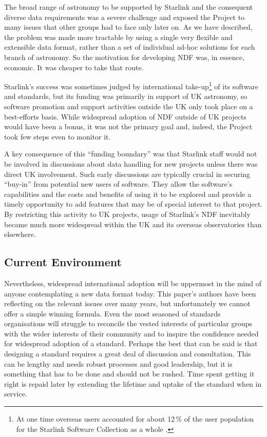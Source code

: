 \documentclass[final,authoryear,5p,times,twocolumn]{elsarticle}
\begin{document}
The broad range of astronomy to be supported by Starlink and the
consequent diverse data requirements was a severe challenge and
exposed the Project to many issues that other groups had to face only
later on. As we have described, the problem was made more tractable by
using a single very flexible and extensible data format, rather than a
set of individual ad-hoc solutions for each branch of astronomy. So
the motivation for developing NDF was, in essence,
economic. It was cheaper to take that route.

Starlink's success was sometimes judged by international
take-up\footnote{At one time overseas users accounted for about
 12\,\% of the user population for the Starlink Software Collection
 as a whole \citep{1992STARB..10...30L}.} of its
software and standards, but its funding was primarily in support of UK
astronomy, so software promotion and support activities outside the UK
only took place on a best-efforts basis. While widespread adoption of
NDF outside of UK projects would have been a bonus, it was
not the primary goal and, indeed, the Project took few steps even to
monitor it.

A key consequence of this ``funding boundary'' was that Starlink staff
would not be involved in discussions about data handling for new
projects unless there was direct UK involvement. Such early
discussions are typically crucial in securing ``buy-in'' from potential
new users of software. They allow the software's capabilities and the
costs and benefits of using it to be explored and provide a timely
opportunity to add features that may be of special interest to that
project. By restricting this activity to UK projects, usage of
Starlink's NDF inevitably became much more widespread
within the UK and its overseas observatories than elsewhere.

\subsection{Current Environment}

Nevertheless, widespread international adoption will be uppermost in
the mind of anyone contemplating a new data format today. This paper's
authors have been reflecting on the relevant issues over many years,
but unfortunately we cannot offer a simple winning formula. Even the
most seasoned of standards organisations will struggle to reconcile
the vested interests of particular groups with the wider interests of
their community and to inspire the confidence needed for widespread
adoption of a standard. Perhaps the best that can be said is that
designing a standard requires a great deal of discussion and
consultation. This can be lengthy and needs robust processes and good
leadership, but it is something that has to be done and should not be
rushed. Time spent getting it right is repaid later by extending the
lifetime and uptake of the standard when in service.
\end{document}
